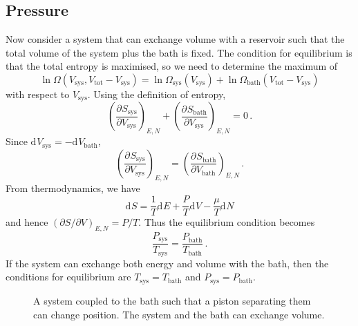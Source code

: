 \documentclass{article}
\theoremstyle{plain}\theoremheaderfont{\normalfont\bfseries}\theorembodyfont{\rmfamily}\theoremseparator{.}\newtheorem*{thm}{Theorem}\newtheorem*{law}{Law}\newtheorem*{pos}{Postulate}
\numberwithin{equation}{section}
\renewcommand{\d}[2][]{\mathrm{d}^{#1} #2}
\newcommand{\pdv}[3][]{\frac{\partial^{#1} #2}{{\partial #3}^{#1}}}
\newcommand{\sys}{\text{sys}}
\newcommand{\bath}{\text{bath}}
\newcommand{\tot}{\text{tot}}
\begin{document}
    \subsection{Pressure}
    Now consider a system that can exchange volume with a reservoir such that the total volume of the system plus the bath is fixed. The condition for equilibrium is that the total entropy is maximised, so we need to determine the maximum of
    \begin{equation}
        \ln{\Omega(V_{\sys},V_{\tot}-V_{\sys})}=\ln{\Omega_{\sys}(V_{\sys})}+\ln\Omega_{\bath}(V_{\tot}-V_{\sys})
    \end{equation}
    with respect to \(V_{\sys}\). Using the definition of entropy,
    \begin{equation}
        \left(\pdv{S_{\sys}}{V_{\sys}}\right)_{E,N}+\left(\pdv{S_{\bath}}{V_{\sys}}\right)_{E,N}=0\,.
    \end{equation}
    Since \(\d{V_{\sys}}=-\d{V_{\bath}}\),
    \begin{equation}
        \left(\pdv{S_{\sys}}{V_{\sys}}\right)_{E,N}=\left(\pdv{S_{\bath}}{V_{\bath}}\right)_{E,N}\,.
    \end{equation}
    From thermodynamics, we have
    \begin{equation}
        \d{S}=\frac{1}{T}\d{E}+\frac{P}{T}\d{V}-\frac{\mu}{T}\d{N}
    \end{equation}
    and hence \((\partial S/\partial V)_{E,N}=P/T\). Thus the equilibrium condition becomes
    \begin{equation}
        \frac{P_{\sys}}{T_{\sys}}=\frac{P_{\bath}}{T_{\bath}}\,.
    \end{equation}
    If the system can exchange both energy and volume with the bath, then the conditions for equilibrium are \(T_{\sys}=T_{\bath}\) and \(P_{\sys}=P_{\bath}\).

    \begin{figure}
        \centering
        \caption{A system coupled to the bath such that a piston separating them can change position. The system and the bath can exchange volume.}
    \end{figure}
\end{document}

